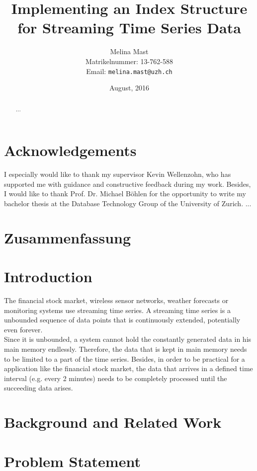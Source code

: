 \documentclass[abstracton,12pt]{scrreprt}
\title{Implementing an Index Structure for Streaming Time Series Data}
\author{
  Melina Mast\\[-5pt]
  \scriptsize Matrikelnummer: 13-762-588\\[-5pt]
  \scriptsize Email: \texttt{melina.mast@uzh.ch}
}
\date{\vspace*{2cm}August, 2016}
\begin{document}
\maketitle

\chapter*{Acknowledgements}

I especially would like to thank my supervisor Kevin Wellenzohn, who has supported me with guidance and constructive feedback during my work. Besides, I would like to thank Prof. Dr. Michael Böhlen for the opportunity to write my bachelor thesis at the Database Technology Group of the University of Zurich. ...   

\begin{abstract}
  ...
\end{abstract}

\chapter*{Zusammenfassung}

\tableofcontents
\listoffigures
\listoftables

\listofalgorithms


\chapter{Introduction}
The financial stock market, wireless sensor networks, weather forecasts or monitoring systems use streaming time series. A streaming time series is a unbounded sequence of data points that is continuously extended, potentially even forever.\\Since it is unbounded, a system cannot hold the constantly generated data in his main memory endlessly. Therefore, the data that is kept in main memory needs to be limited to a part of the time series. Besides, in order to be practical for a application like the financial stock market, the data that arrives in a defined time interval (e.g. every 2 minutes) needs to be completely processed until the succeeding data arises. 

\chapter{Background and Related Work}
\chapter{Problem Statement}
\end{document}
